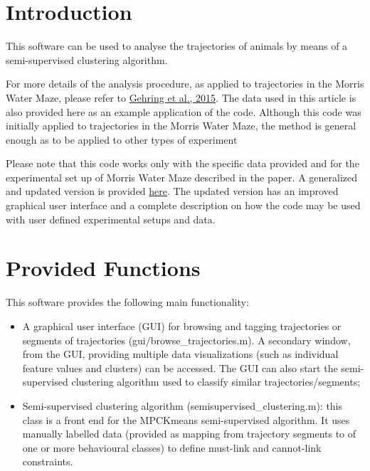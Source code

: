 \documentclass[12pt,titlepage]{article}
\begin{document}
\begin{doublespace}
\section{Introduction}

\indent This software can be used to analyse the trajectories of animals by means of a semi-supervised clustering algorithm.

For more details of the analysis procedure, as applied to trajectories in the Morris Water Maze, please refer to \href{http://www.nature.com/articles/srep14562}{Gehring et al., 2015}. The data used in this article is also provided here as an example application of the code. Although this code was initially applied to trajectories in the Morris Water Maze, the method is general enough as to be applied to other types of experiment

Please note that this code works only with the specific data provided and for the experimental set up of Morris Water Maze described in the paper. A generalized and updated version is provided \href{https://github.com/RodentDataAnalytics/roda}{here}. The updated version has an improved graphical user interface and a complete description on how the code may be used with user defined experimental setups and data.


\section{Provided Functions}

This software provides the following main functionality:
\begin{itemize}
	\item A graphical user interface (GUI) for browsing and tagging trajectories or segments of trajectories (gui$/$browse\_trajectories.m). A secondary window, from the GUI, providing multiple data visualizations (such as individual feature values and clusters) can be accessed. The GUI can also start the semi-supervised clustering algorithm used to classify similar trajectories/segments;
	
	\item Semi-supervised clustering algorithm (semisupervised\_clustering.m): this class is a front end for the MPCKmeans semi-supervised algorithm. It uses manually labelled data (provided as mapping from trajectory segments to of one or more behavioural classes) to define must-link and cannot-link constraints.
	

\end{itemize}
\end{doublespace}
\end{document}
